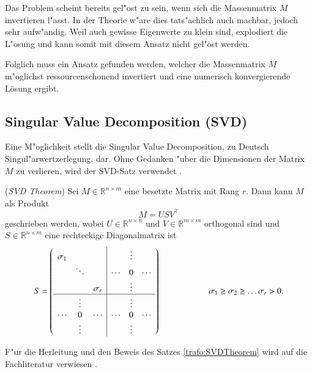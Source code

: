 \begin{refsection}
Das Problem scheint bereits gel"ost zu sein, wenn sich die Massenmatrix $M$ invertieren l"asst. In der Theorie w"are dies tats"achlich auch machbar, jedoch sehr aufw"andig. Weil auch gewisse Eigenwerte zu klein sind, explodiert die L"osung und kann somit mit diesem Ansatz nicht gel"ost werden.

Folglich muss ein Ansatz gefunden werden, welcher die Massenmatrix $M$ m"oglichst ressourcenschonend invertiert und eine numerisch konvergierende Lösung ergibt. 


\subsection{Singular Value Decomposition (SVD) }
Eine M"oglichkeit stellt die Singular Value Decomposition, zu Deutsch Singul"arwertzerlegung, dar. Ohne Gedanken "uber die Dimensionen der Matrix $M$ zu verlieren, wird der SVD-Satz verwendet \cite{trafo:Watkins}. 

\begin{satz}
	\label{trafo:SVDTheorem}
	(\textit{SVD Theorem}) Sei $M\in \mathbb{R}^{n \times m}$ eine besetzte Matrix mit Rang $r$. Dann kann $M$ als Produkt
	\begin{equation}
		M = USV^\top
		\label{trafo:svd}
	\end{equation} 
	geschrieben werden, wobei $U \in \mathbb{R}^{n \times n}$ und $V \in \mathbb{R}^{m \times m}$ orthogonal sind und $S \in \mathbb{R}^{n \times m}$ eine rechteckige Diagonalmatrix ist 
	\begin{equation*}
		S = \left( 
			\begin{array}{ccc|ccc}
				\sigma_1 &          &          &        & \vdots &        \\
				& \ddots   &          & \cdots & 0      & \cdots \\
				&          & \sigma_r &        & \vdots &        \\
				\hline
				&  \vdots  &          &        & \vdots &        \\
				\cdots   &  0       & \cdots   & \cdots & 0      & \cdots \\
				&  \vdots  &          &        & \vdots &   \\				
				\end{array}
			\right) 
			\hspace{2cm}\sigma_1 \geq \sigma_2 \geq \dots \sigma_r > 0. 
	\end{equation*}
\end{satz}
F"ur die Herleitung und den Beweis des Satzes \ref{trafo:SVDTheorem} wird auf die Fachliteratur verwiesen \cite{trafo:Watkins}.


\end{refsection}
